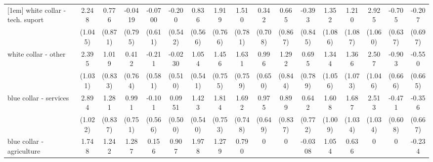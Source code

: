 {\begin{tabular}{l*{16}{c}}
[1em]
white collar - tech. suport&       2.248\sym{*}  &       0.776         &     -0.0419         &     -0.0700         &      -0.200         &       0.836         &       1.919\sym{*}  &       1.510         &       0.342         &       0.665         &      -0.393         &       1.352         &       1.210         &       2.925\sym{**} &      -0.705         &      -0.207         \\
                    &     (1.045)         &     (0.871)         &     (0.795)         &     (0.611)         &     (0.542)         &     (0.566)         &     (0.766)         &     (0.781)         &     (0.708)         &     (0.867)         &     (0.845)         &     (1.086)         &     (1.087)         &     (1.060)         &     (0.637)         &     (0.697)         \\
[1em]
white collar - other&       2.395\sym{*}  &       1.019         &       0.412         &      -0.211         &     -0.0230         &       1.054         &       1.456         &       1.631\sym{*}  &       0.996         &       1.292         &       0.695         &       1.344         &       1.366         &       2.507\sym{*}  &      -0.903         &      -0.550         \\
                    &     (1.031)         &     (0.833)         &     (0.764)         &     (0.581)         &     (0.510)         &     (0.541)         &     (0.755)         &     (0.759)         &     (0.650)         &     (0.844)         &     (0.789)         &     (1.056)         &     (1.073)         &     (1.046)         &     (0.666)         &     (0.665)         \\
[1em]
blue collar - services&       2.894\sym{**} &       1.281         &       0.991         &      -0.101         &      0.0951         &       1.423\sym{**} &       1.814\sym{*}  &       1.692\sym{*}  &       0.975         &       0.899         &       0.642         &       1.608         &       1.687         &       2.513\sym{*}  &      -0.471         &      -0.356         \\
                    &     (1.022)         &     (0.837)         &     (0.751)         &     (0.566)         &     (0.500)         &     (0.540)         &     (0.753)         &     (0.748)         &     (0.649)         &     (0.837)         &     (0.772)         &     (1.009)         &     (1.034)         &     (1.034)         &     (0.608)         &     (0.667)         \\
[1em]
blue collar - agriculture&       1.748         &       1.242         &       1.287         &       0.156         &       0.907         &       1.978\sym{*}  &       1.279         &       0.790         &           0         &           0         &     -0.0308         &       1.054         &       0.636         &           0         &           0         &      -0.234         \\

\end{tabular}}
